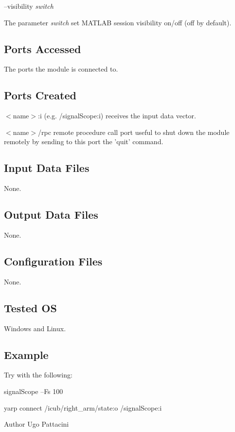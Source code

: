 --visibility {\itshape switch} 
\begin{DoxyItemize}
\item The parameter {\itshape switch} set M\+A\+T\+L\+A\+B session visibility on/off (off by default).
\end{DoxyItemize}\hypertarget{group__icub__signalScope_portsa_sec}{}\subsection{Ports Accessed}\label{group__icub__signalScope_portsa_sec}
The ports the module is connected to.\hypertarget{group__icub__tld_portsc_sec}{}\subsection{Ports Created}\label{group__icub__tld_portsc_sec}

\begin{DoxyItemize}
\item {\itshape } $<$name$>$\+:i (e.\+g. /signal\+Scope\+:i) receives the input data vector.
\item {\itshape } $<$name$>$/rpc remote procedure call port useful to shut down the module remotely by sending to this port the 'quit' command.
\end{DoxyItemize}\hypertarget{group__icub__signalScope_in_files_sec}{}\subsection{Input Data Files}\label{group__icub__signalScope_in_files_sec}
None.\hypertarget{group__icub__signalScope_out_data_sec}{}\subsection{Output Data Files}\label{group__icub__signalScope_out_data_sec}
None.\hypertarget{group__icub__signalScope_conf_file_sec}{}\subsection{Configuration Files}\label{group__icub__signalScope_conf_file_sec}
None.\hypertarget{group__icub__tld_tested_os_sec}{}\subsection{Tested O\+S}\label{group__icub__tld_tested_os_sec}
Windows and Linux.\hypertarget{group__icub__signalScope_example_sec}{}\subsection{Example}\label{group__icub__signalScope_example_sec}
Try with the following\+:


\begin{DoxyItemize}
\item signal\+Scope --Fs 100
\item yarp connect /icub/right\+\_\+arm/state\+:o /signal\+Scope\+:i 
\end{DoxyItemize}

\begin{DoxyAuthor}{Author}
Ugo Pattacini 
\end{DoxyAuthor}
